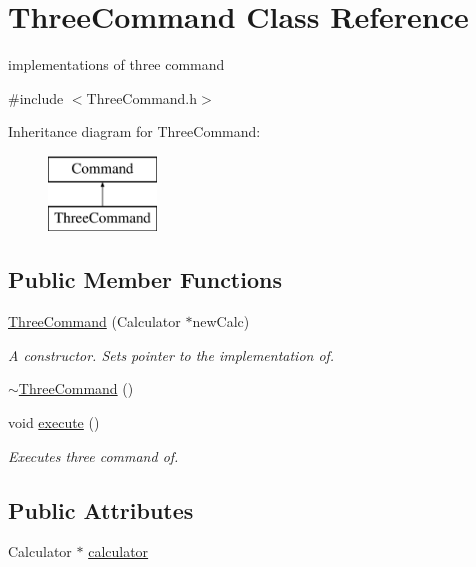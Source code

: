 \hypertarget{class_three_command}{}\section{Three\+Command Class Reference}
\label{class_three_command}


implementations of three command  




{\ttfamily \#include $<$Three\+Command.\+h$>$}

Inheritance diagram for Three\+Command\+:\begin{figure}[H]
\begin{center}
\leavevmode
\includegraphics[height=2.000000cm]{class_three_command}
\end{center}
\end{figure}
\subsection*{Public Member Functions}
\begin{DoxyCompactItemize}
\item 
\hyperlink{class_three_command_a6d1887ffb18cd3772b9164d68e86b72c}{Three\+Command} (Calculator $\ast$new\+Calc)
\begin{DoxyCompactList}\small\item\em A constructor. Sets pointer to the implementation of. \end{DoxyCompactList}\item 
\hyperlink{class_three_command_a2d1d9c12174c3b40105ba216a0465033}{$\sim$\+Three\+Command} ()
\item 
void \hyperlink{class_three_command_af8e301161be213f999f4fd49ffa4db67}{execute} ()
\begin{DoxyCompactList}\small\item\em Executes three command of. \end{DoxyCompactList}\end{DoxyCompactItemize}
\subsection*{Public Attributes}
\begin{DoxyCompactItemize}
\item 
Calculator $\ast$ \hyperlink{class_three_command_a8a2a28c69c47a9e7d65a0b487c41596a}{calculator}
\end{DoxyCompactItemize}


